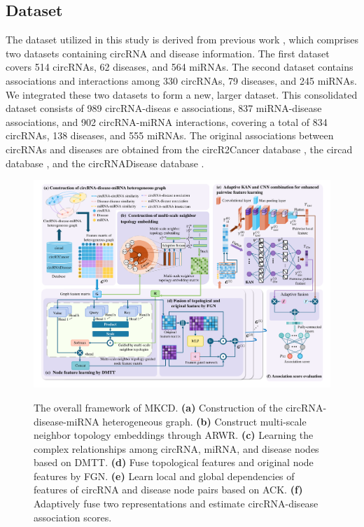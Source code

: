 \documentclass[journal=jcisd8,manuscript=article]{achemso}
\begin{document}
\subsection{Dataset}
\vspace{-0.3cm}
The dataset utilized in this study is derived from previous work \cite{lan2022kgancda}, which comprises two datasets containing circRNA and disease information. The first dataset covers 514 circRNAs, 62 diseases, and 564 miRNAs. The second dataset contains associations and interactions among 330 circRNAs, 79 diseases, and 245 miRNAs. We integrated these two datasets to form a new, larger dataset. This consolidated dataset consists of 989 circRNA-diseas e associations, 837 miRNA-disease associations, and 902 circRNA-miRNA interactions, covering a total of 834 circRNAs, 138 diseases, and 555 miRNAs. The original associations between circRNAs and diseases are obtained from the circR2Cancer database \cite{lan2020circr2cancer}, the circad database \cite{rophina2020circad}, and the circRNADisease database \cite{zhao2018circrna}.

\vspace{-0.1cm}
\begin{figure}
    \centering
    \includegraphics[width=\textwidth]{fig/visio1.pdf}\\       
	\caption{The overall framework of MKCD. \textbf{(a)} Construction of the circRNA-disease-miRNA heterogeneous graph. \textbf{(b)} Construct multi-scale neighbor topology embeddings through ARWR. \textbf{(c)} Learning the complex relationships among circRNA, miRNA, and disease nodes based on DMTT. \textbf{(d)} Fuse topological features and original node features by FGN. \textbf{(e)} Learn local and global dependencies of features of circRNA and disease node pairs based on ACK. \textbf{(f)} Adaptively fuse two representations and estimate circRNA-disease association scores.}
    \label{fig:visio1}
\end{figure}
\vspace{-0.5cm}
\end{document}
